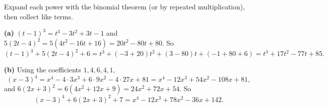 Expand each power with the binomial theorem (or by repeated multiplication), then collect like terms.

\textbf{(a)} $(t-1)^3=t^3-3t^2+3t-1$ and $5(2t-4)^2=5\left(4t^2-16t+16\right)=20t^2-80t+80$. So
\[(t-1)^3+5(2t-4)^2+6=t^3+(-3+20)t^2+(3-80)t+(-1+80+6)=\boxed{t^3+17t^2-77t+85}.\]

\textbf{(b)} Using the coefficients $1,4,6,4,1$,
\[(x-3)^4=x^4-4\cdot3x^3+6\cdot9x^2-4\cdot27x+81=x^4-12x^3+54x^2-108x+81,\]
and $6(2x+3)^2=6\left(4x^2+12x+9\right)=24x^2+72x+54$. So
\[(x-3)^4+6(2x+3)^2+7=\boxed{x^4-12x^3+78x^2-36x+142}.\]
